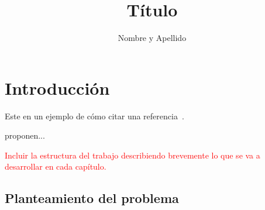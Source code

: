 \documentclass[a4paper, 12pt, print, index, oneside, times, custombib]{PhDThesisPSnPDF}
\title{Título}
\author{Nombre y Apellido}
\begin{document}
\frontmatter

\maketitle

%	
%	
%	
%	


\tableofcontents

\listoffigures

\listoftables


\printnomenclature

\mainmatter
%	
%	
%	
%        
%        
%
%
%
%



	



\chapter{Introducción}
\label{sec:Introducción}

Este en un ejemplo de cómo citar una referencia~\parencite{MachineLearningandDeepLearning}.

\textcite{MachineLearningandDeepLearning} proponen...


\textcolor{red}{Incluir la estructura del trabajo describiendo brevemente lo que se va a desarrollar en cada capítulo.}

\section{Planteamiento del problema} 
\label{sec:Planteamiento}
\end{document}
